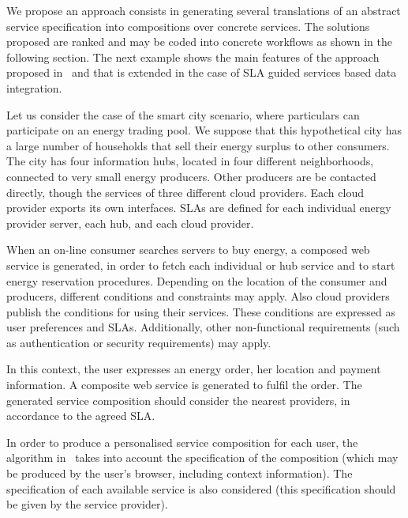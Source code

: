 We propose an approach consists in generating several translations of an abstract service specification into compositions
over concrete  services. 
The solutions proposed are ranked and may be coded into concrete workflows as shown in the following section.  The next example shows the main features of the approach proposed in~\cite{CostaAMR13} and that is extended in the case of SLA guided services based data integration. 

\begin{example}\label{Ex:rew1}
Let us consider the case of the smart city scenario, where particulars can participate on an energy trading pool.
We suppose that this hypothetical city has a large number of households that sell their energy surplus to other consumers. 
The city has four information hubs, located in four different neighborhoods, connected to very small energy producers.
Other producers are be contacted directly, though the services of three different cloud providers.
Each cloud provider exports its own interfaces.
 SLAs are defined for each individual energy provider server, each hub, and each cloud provider. 

When an on-line consumer searches  servers to buy energy, a composed web service is generated, in order to fetch each individual or hub service and to start  energy reservation procedures.
Depending on the location of the consumer and producers, different conditions and constraints may apply.
Also  cloud providers  publish the conditions for using their services.
These conditions are expressed as user preferences and SLAs.
Additionally, other non-functional requirements (such as authentication or security requirements) may apply.

In this context, the user  expresses an energy order, her location and payment information. A composite web service is  generated to fulfil the order.
The generated service composition should consider the nearest providers, in accordance to the agreed SLA.

In order to produce a personalised service composition for each user, the algorithm in~\cite{CostaAMR13} takes into account the specification of the composition (which may be produced by the user's browser, including context information).
The specification of each available service is also considered (this specification should be given by the service provider).
~\hfill\openbox
\end{example}


